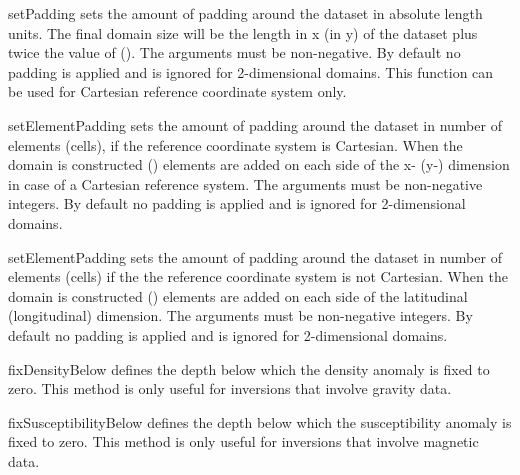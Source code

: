 \begin{methoddesc}[DomainBuilder]{setPadding}{%
%
}
sets the amount of padding around the dataset in absolute length units.
The final domain size will be the length in x (in y) of the dataset plus twice
the value of  (). The arguments must be non-negative.
By default no padding is applied and  is ignored for 2-dimensional
domains. This function can be used for Cartesian reference coordinate system  only.
\end{methoddesc}

\begin{methoddesc}[DomainBuilder]{setElementPadding}{%
%
}
sets the amount of padding around the dataset in number of elements (cells),
if the reference coordinate system is Cartesian. 
When the domain is constructed  () elements are
added on each side of the x- (y-) dimension in case of a Cartesian reference system. The arguments must be non-negative integers.
By default no padding is applied and  is ignored for 2-dimensional
domains.
\end{methoddesc}

\begin{methoddesc}[DomainBuilder]{setElementPadding}{%
%
}
sets the amount of padding around the dataset in number of elements (cells) if the the reference coordinate system is not Cartesian.
When the domain is constructed  () elements are
added on each side of the latitudinal (longitudinal) dimension. The arguments must be non-negative integers.
By default no padding is applied and  is ignored for 2-dimensional
domains.
\end{methoddesc}

\begin{methoddesc}[DomainBuilder]{fixDensityBelow}{%
}
defines the depth below which the density anomaly is fixed to zero.
This method is only useful for inversions that involve gravity data.
\end{methoddesc}

\begin{methoddesc}[DomainBuilder]{fixSusceptibilityBelow}{%
}
defines the depth below which the susceptibility anomaly is fixed to zero.
This method is only useful for inversions that involve magnetic data.
\end{methoddesc}

